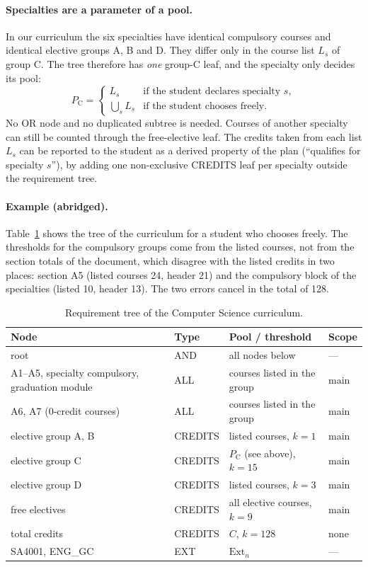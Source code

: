 \documentclass[10pt,a4paper]{article}
\begin{document}
\paragraph{Specialties are a parameter of a pool.}
In our curriculum the six specialties have identical compulsory courses and
identical elective groups A, B and D. They differ only in the course list
$L_s$ of group C. The tree therefore has \emph{one} group-C leaf, and the
specialty only decides its pool:
\[
  P_{\mathrm{C}}=
  \begin{cases}
    L_s & \text{if the student declares specialty } s,\\[2pt]
    \bigcup_{s} L_s & \text{if the student chooses freely.}
  \end{cases}
\]
No OR node and no duplicated subtree is needed. Courses of another specialty
can still be counted through the free-elective leaf. The credits taken from
each list $L_s$ can be reported to the student as a derived property of the plan
(``qualifies for specialty $s$''), by adding one non-exclusive CREDITS leaf per
specialty outside the requirement tree.
 
\paragraph{Example (abridged).}
Table~\ref{tab:tree} shows the tree of the curriculum for a student who
chooses freely. The thresholds for the compulsory groups come from the
listed courses, not from the section totals of the document, which disagree
with the listed credits in two places: section A5 (listed courses 24, header 21)
and the compulsory block of the specialties (listed 10, header 13). The two
errors cancel in the total of 128.
 
\begin{table}[ht]
\centering
\small
\begin{tabular}{@{}p{4.3cm}lp{5.6cm}l@{}}
\toprule
\textbf{Node} & \textbf{Type} & \textbf{Pool / threshold} & \textbf{Scope} \\
\midrule
root & AND & all nodes below & --- \\
A1--A5, specialty compulsory, graduation module & ALL & courses listed in the group & main \\
A6, A7 (0-credit courses) & ALL & courses listed in the group & main \\
elective group A, B & CREDITS & listed courses, $k=1$ & main \\
elective group C & CREDITS & $P_{\mathrm{C}}$ (see above), $k=15$ & main \\
elective group D & CREDITS & listed courses, $k=3$ & main \\
free electives & CREDITS & all elective courses, $k=9$ & main \\
total credits & CREDITS & $C$, $k=128$ & none \\
SA4001, ENG\_GC & EXT & $\mathrm{Ext}_n$ & --- \\
\bottomrule
\end{tabular}
\caption{Requirement tree of the Computer Science curriculum.}
\label{tab:tree}
\end{table}
 
\end{document}
